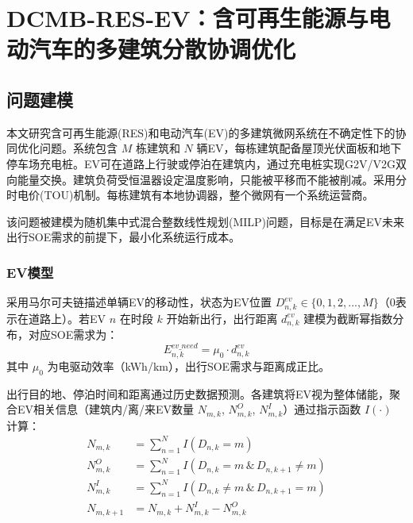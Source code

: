 \documentclass[11pt]{ctexart}
\begin{document}
\section{DCMB-RES-EV：含可再生能源与电动汽车的多建筑分散协调优化}

\subsection{问题建模}

本文研究含可再生能源(RES)和电动汽车(EV)的多建筑微网系统在不确定性下的协同优化问题。系统包含 $M$ 栋建筑和 $N$ 辆EV，每栋建筑配备屋顶光伏面板和地下停车场充电桩。EV可在道路上行驶或停泊在建筑内，通过充电桩实现G2V/V2G双向能量交换。建筑负荷受恒温器设定温度影响，只能被平移而不能被削减。采用分时电价(TOU)机制。每栋建筑有本地协调器，整个微网有一个系统运营商。

该问题被建模为随机集中式混合整数线性规划(MILP)问题，目标是在满足EV未来出行SOE需求的前提下，最小化系统运行成本。

\subsubsection{EV模型}

采用马尔可夫链描述单辆EV的移动性，状态为EV位置 $D_{n,k}^{ev} \in \{0,1,2,...,M\}$（0表示在道路上）。若EV $n$ 在时段 $k$ 开始新出行，出行距离 $d_{n,k}^{ev}$ 建模为截断幂指数分布，对应SOE需求为：
\begin{equation}
    E_{n,k}^{ev\_need} = \mu_0 \cdot d_{n,k}^{ev}
\end{equation}
其中 $\mu_0$ 为电驱动效率（kWh/km），出行SOE需求与距离成正比。

出行目的地、停泊时间和距离通过历史数据预测。各建筑将EV视为整体储能，聚合EV相关信息（建筑内/离/来EV数量 $N_{m,k}$, $N_{m,k}^O$, $N_{m,k}^I$）通过指示函数 $I(\cdot)$ 计算：
\begin{align}
    N_{m,k} &= \sum_{n=1}^{N} I(D_{n,k} = m) \\
    N_{m,k}^O &= \sum_{n=1}^{N} I(D_{n,k} = m \,\&\, D_{n,k+1} \neq m) \\
    N_{m,k}^I &= \sum_{n=1}^{N} I(D_{n,k} \neq m \,\&\, D_{n,k+1} = m) \\
    N_{m,k+1} &= N_{m,k} + N_{m,k}^I - N_{m,k}^O
\end{align}
\end{document}
